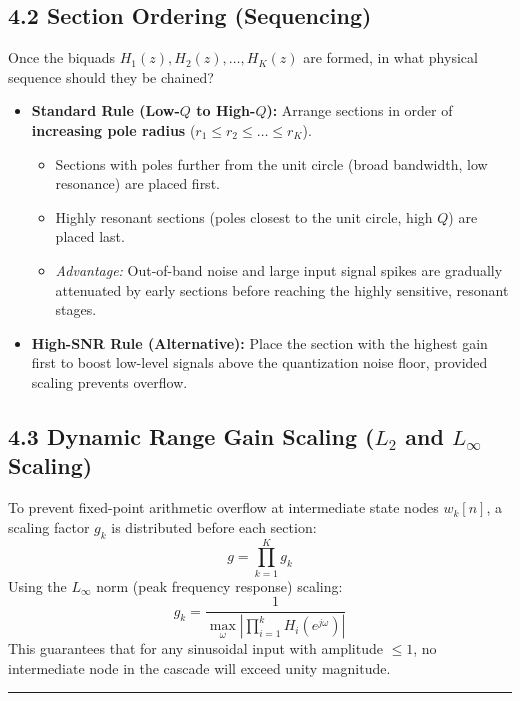 \documentclass[11pt,a4paper]{article}
\begin{document}
\subsection{4.2 Section Ordering (Sequencing)}
Once the biquads $H_1(z), H_2(z), \dots, H_K(z)$ are formed, in what physical sequence should they be chained?
\begin{itemize}
    \item \textbf{Standard Rule (Low-$Q$ to High-$Q$):} Arrange sections in order of \textbf{increasing pole radius} ($r_1 \le r_2 \le \dots \le r_K$).
    \begin{itemize}
        \item Sections with poles further from the unit circle (broad bandwidth, low resonance) are placed first.
        \item Highly resonant sections (poles closest to the unit circle, high $Q$) are placed last.
        \item \textit{Advantage:} Out-of-band noise and large input signal spikes are gradually attenuated by early sections before reaching the highly sensitive, resonant stages.
    \end{itemize}
    \item \textbf{High-SNR Rule (Alternative):} Place the section with the highest gain first to boost low-level signals above the quantization noise floor, provided scaling prevents overflow.
\end{itemize}

\subsection{\texorpdfstring{4.3 Dynamic Range Gain Scaling ($L_2$ and $L_\infty$ Scaling)}{4.3 Dynamic Range Gain Scaling (L2 and L-infinity Scaling)}}
To prevent fixed-point arithmetic overflow at intermediate state nodes $w_k[n]$, a scaling factor $g_k$ is distributed before each section:
\begin{equation}
g = \prod_{k=1}^{K} g_k
\end{equation}
Using the $L_\infty$ norm (peak frequency response) scaling:
\begin{equation}
g_k = \frac{1}{\max_{\omega} \left| \prod_{i=1}^k H_i(e^{j\omega}) \right|}
\end{equation}
This guarantees that for any sinusoidal input with amplitude $\le 1$, no intermediate node in the cascade will exceed unity magnitude.

\noindent\rule{\textwidth}{0.5pt}
\end{document}
